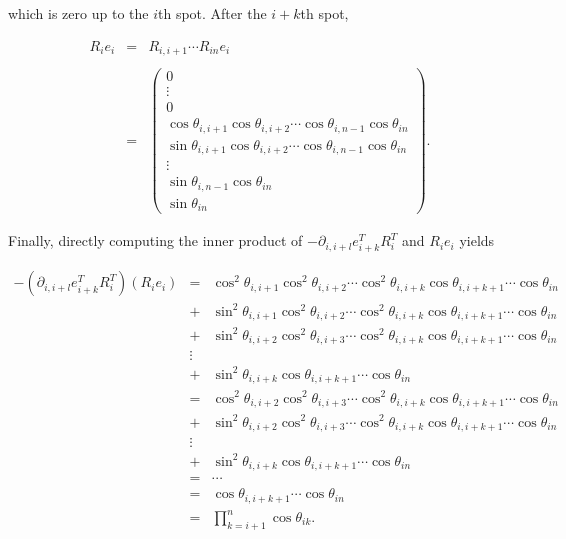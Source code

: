 \documentclass[ba]{imsart}
\numberwithin{equation}{section}
\theoremstyle{plain}
\begin{document}
\noindent which is zero up to the $i$th spot. After the $i+k$th spot,

\begin{eqnarray}
R_i e_i &=&   R_{i,i+1} \cdots R_{in} e_i \\
\\
&=&
\begin{pmatrix}
0\\
\vdots\\
0\\
\cos \theta_{i,i+1} \cos \theta_{i,i+2} \cdots \cos \theta_{i,n-1} \cos \theta_{in}\\
\sin \theta_{i,i+1} \cos \theta_{i,i+2} \cdots \cos \theta_{i,n-1} \cos \theta_{in}\\
\vdots\\
\sin \theta_{i,n-1} \cos \theta_{in}\\
\sin \theta_{in}
\end{pmatrix}.
\end{eqnarray}

\noindent Finally, directly computing the inner product of $-\partial_{i,i+l} e_{i+k}^T R_i^T$ and $R_i e_i$ yields

\begin{eqnarray}
-(\partial_{i,i+l} e_{i+k}^T R_i^T) (R_i e_i)
&=&
\cos^2 \theta_{i,i+1} \cos^2 \theta_{i,i+2}  \cdots \cos^2 \theta_{i,i+k}  \cos \theta_{i,i+k+1} \cdots \cos \theta_{in} \nonumber\\
&+& \sin^2 \theta_{i,i+1} \cos^2 \theta_{i,i+2} \cdots \cos^2 \theta_{i,i+k}  \cos \theta_{i,i+k+1} \cdots \cos \theta_{in} \nonumber\\
&+&  \sin^2 \theta_{i,i+2} \cos^2 \theta_{i,i+3} \cdots \cos^2 \theta_{i,i+k}  \cos \theta_{i,i+k+1} \cdots \cos \theta_{in} \nonumber\\
&\vdots&  \nonumber\\
&+&  \sin^2 \theta_{i,i+k} \cos \theta_{i,i+k+1} \cdots \cos \theta_{in}
 \nonumber\\
&=&
\cos^2 \theta_{i,i+2} \cos^2 \theta_{i,i+3}  \cdots \cos^2 \theta_{i,i+k}  \cos \theta_{i,i+k+1} \cdots \cos \theta_{in}  \nonumber\\
&+&  \sin^2 \theta_{i,i+2} \cos^2 \theta_{i,i+3} \cdots \cos^2 \theta_{i,i+k}  \cos \theta_{i,i+k+1} \cdots \cos \theta_{in}  \nonumber\\
&\vdots&  \nonumber\\
&+&  \sin^2 \theta_{i,i+k} \cos \theta_{i,i+k+1} \cdots \cos \theta_{in}  \nonumber\\
&=& \cdots \nonumber\\
&=& \cos \theta_{i,i+k+1} \cdots \cos \theta_{in}\nonumber\\
&=& \prod_{k=i+1}^n \cos \theta_{ik}.
\end{eqnarray}
\end{document}
